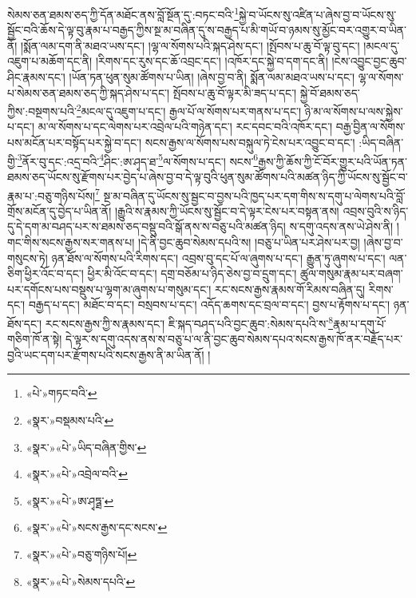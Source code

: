 སེམས་ཅན་ཐམས་ཅད་ཀྱི་དོན་མཐོང་ནས་བློ་སྔོན་དུ་:བཏང་བའི་\footnote{«པེ་»གཏང་བའི་}སྐྱེ་བ་ཡོངས་སུ་འཛིན་པ་ཞེས་བྱ་བ་ཡོངས་སུ་སྦྱོང་བའི་ཆོས་དེ་ལྟ་བུ་རྣམ་པ་བརྒྱད་ཀྱིས་སྔ་མ་བཞིན་དུ་ས་བརྒྱད་པ་མི་གཡོ་བ་ཉམས་སུ་མྱོང་བར་འགྱུར་བ་ཡིན་ནོ། །སྨོན་ལམ་དག་ནི་མཐའ་ཡས་དང་། །ལྷ་ལ་སོགས་པའི་སྐད་ཤེས་དང་། །སྤོབས་པ་ཆུ་བོ་ལྟ་བུ་དང་། །མངལ་དུ་འཇུག་པ་མཆོག་དང་ནི། །རིགས་དང་རུས་དང་ཆོ་འབྲང་དང་། །འཁོར་དང་སྐྱེ་བ་དག་དང་ནི། །ངེས་འབྱུང་བྱང་ཆུབ་ཤིང་རྣམས་དང་། །ཡོན་ཏན་ཕུན་སུམ་ཚོགས་པ་ཡིན། །ཞེས་བྱ་བ་ནི། སྨོན་ལམ་མཐའ་ཡས་པ་དང་། ལྷ་ལ་སོགས་པ་སེམས་ཅན་ཐམས་ཅད་ཀྱི་སྐད་ཤེས་པ་དང་། སྤོབས་པ་ཆུ་བོ་ལྟར་མི་ཟད་པ་དང་། སྐྱེ་བོ་ཐམས་ཅད་ཀྱིས་:བསྔགས་པའི་\footnote{«སྣར་»བསྡམས་པའི་}མངལ་དུ་འཇུག་པ་དང་། རྒྱལ་པོ་ལ་སོགས་པར་གནས་པ་དང་། ཉི་མ་ལ་སོགས་པ་ལས་སྐྱེས་པ་དང་། མ་ལ་སོགས་པ་དང་ལེགས་པར་འབྲེལ་པའི་གཉེན་དང་། རང་དབང་བའི་འཁོར་དང་། བརྒྱ་བྱིན་ལ་སོགས་པས་མངོན་པར་བསྟོད་པར་སྐྱེ་བ་དང་། སངས་རྒྱས་ལ་སོགས་པས་བསྐུལ་ཏེ་ངེས་པར་འབྱུང་བ་དང་། :ཡིད་བཞིན་གྱི་\footnote{«སྣར་»«པེ་»ཡིད་བཞིན་གྱིས་}ནོར་བུ་དང་:འདྲ་བའི་\footnote{«སྣར་»«པེ་»འབྲེལ་བའི་}ཤིང་:ཨ་ཤྭད་ཐ་\footnote{«སྣར་»«པེ་»ཨ་ཤྭཏྠ་}ལ་སོགས་པ་དང་། སངས་\footnote{«སྣར་»«པེ་»སངས་རྒྱས་དང་སངས་}རྒྱས་ཀྱི་ཆོས་ཀྱི་ངོ་བོར་གྱུར་པའི་ཡོན་ཏན་ཐམས་ཅད་ཡོངས་སུ་རྫོགས་པར་བྱེད་པ་ཞེས་བྱ་བ་དེ་ལྟ་བུའི་ཕུན་སུམ་ཚོགས་པའི་མཚན་ཉིད་ཀྱི་ཡོངས་སུ་སྦྱོང་བ་རྣམ་པ་:བཅུ་གཉིས་པོས།\footnote{«སྣར་»«པེ་»བཅུ་གཉིས་པོ།} སྔ་མ་བཞིན་དུ་ཡོངས་སུ་སྦྱང་བ་བྱས་པའི་ཁྱད་པར་དག་གིས་ས་དགུ་པ་ལེགས་པའི་བློ་གྲོས་མངོན་དུ་བྱེད་པ་ཡིན་ནོ། །རྒྱུའི་ས་རྣམས་ཀྱི་ཡོངས་སུ་སྦྱོང་བ་དེ་ལྟར་ངེས་པར་བསྟན་ནས། འབྲས་བུའི་ས་ཉིད་དུ་དེ་དག་མ་བཤད་པར་ས་ཐམས་ཅད་བསྡུ་བའི་སྒོ་ནས་ས་བཅུ་པའི་མཚན་ཉིད། ས་དགུ་འདས་ནས་ཡེ་ཤེས་ནི། །གང་གིས་སངས་རྒྱས་སར་གནས་པ། །དེ་ནི་བྱང་ཆུབ་སེམས་དཔའི་ས། །བཅུ་པ་ཡིན་པར་ཤེས་པར་བྱ། །ཞེས་བྱ་བ་གསུངས་ཏེ། ཉན་ཐོས་ལ་སོགས་པའི་རིགས་དང་། འབྲས་བུ་དང་པོ་ལ་ཞུགས་པ་དང་། རྒྱུན་ཏུ་ཞུགས་པ་དང་། ལན་ཅིག་ཕྱིར་འོང་བ་དང་། ཕྱིར་མི་འོང་བ་དང་། དགྲ་བཅོམ་པ་ཉིད་ཅེས་བྱ་བ་དྲུག་དང་། ཚུལ་གསུམ་རྣམ་པར་བཞག་པར་དགོངས་པས་བསྡུས་པ་ལྷག་མ་ཞུགས་པ་གསུམ་དང་། རང་སངས་རྒྱས་རྣམས་གོ་རིམས་བཞིན་དུ། རིགས་དང་། བརྒྱད་པ་དང་། མཐོང་བ་དང་། བསྲབས་པ་དང་། འདོད་ཆགས་དང་བྲལ་བ་དང་། བྱས་པ་རྟོགས་པ་དང་། ཉན་ཐོས་དང་། རང་སངས་རྒྱས་ཀྱི་ས་རྣམས་དང་། ཇི་སྐད་བཤད་པའི་བྱང་ཆུབ་:སེམས་དཔའི་ས་\footnote{«སྣར་»«པེ་»སེམས་དཔའི་}རྣམ་པ་དགུ་པོ་གཅིག་ཁོ་ན་སྟེ། དེ་ལྟར་ས་དགུ་འདས་ནས་ས་བཅུ་པ་ལ་ནི་བྱང་ཆུབ་སེམས་དཔའ་སངས་རྒྱས་ཁོ་ནར་བརྗོད་པར་བྱའི་ཡང་དག་པར་རྫོགས་པའི་སངས་རྒྱས་ནི་མ་ཡིན་ནོ། །
